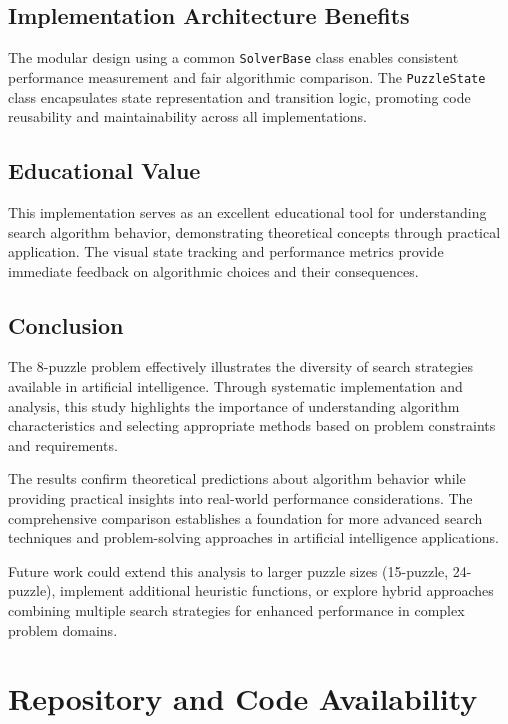 \documentclass[11pt,a4paper]{article}
\begin{document}
\subsection{Implementation Architecture Benefits}

The modular design using a common \texttt{SolverBase} class enables consistent performance measurement and fair algorithmic comparison. The \texttt{PuzzleState} class encapsulates state representation and transition logic, promoting code reusability and maintainability across all implementations.

\subsection{Educational Value}

This implementation serves as an excellent educational tool for understanding search algorithm behavior, demonstrating theoretical concepts through practical application. The visual state tracking and performance metrics provide immediate feedback on algorithmic choices and their consequences.

\subsection{Conclusion}

The 8-puzzle problem effectively illustrates the diversity of search strategies available in artificial intelligence. Through systematic implementation and analysis, this study highlights the importance of understanding algorithm characteristics and selecting appropriate methods based on problem constraints and requirements.

The results confirm theoretical predictions about algorithm behavior while providing practical insights into real-world performance considerations. The comprehensive comparison establishes a foundation for more advanced search techniques and problem-solving approaches in artificial intelligence applications.

Future work could extend this analysis to larger puzzle sizes (15-puzzle, 24-puzzle), implement additional heuristic functions, or explore hybrid approaches combining multiple search strategies for enhanced performance in complex problem domains.


\section{Repository and Code Availability}
\end{document}
